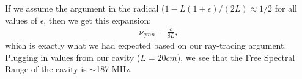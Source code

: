 If we assume the argument in the radical ($1-L(1+\epsilon)/(2L)\approx 1/2$ for all values of $\epsilon$, then we get this expansion: 
\begin{align}
\nu_{qmn}=\frac{c}{8L},
\end{align}
which is exactly what we had expected based on our ray-tracing argument.
Plugging in values from our cavity ($L=20 cm$), we see that the Free Spectral Range of the cavity is $\sim$187 MHz.










